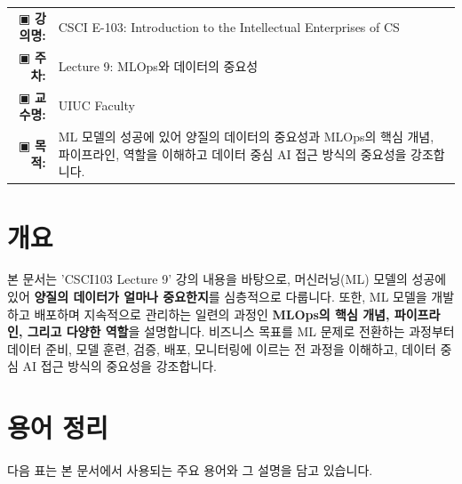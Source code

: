 \documentclass[11pt,a4paper]{article}
\makeatletter
\theoremstyle{definition}
\newcommand{\metainfo}[4]{
\begin{tcolorbox}[
    colback=lightpurple,
    colframe=darkpurple,
    boxrule=1pt,
    arc=2mm,
    left=10pt,
    right=10pt,
    top=8pt,
    bottom=8pt
]
\begin{tabular}{@{}rl@{}}
▣ \textbf{강의명:} & #1 \\[0.3em]
▣ \textbf{주차:} & #2 \\[0.3em]
▣ \textbf{교수명:} & #3 \\[0.3em]
▣ \textbf{목적:} & \begin{minipage}[t]{0.75\textwidth}#4\end{minipage}
\end{tabular}
\end{tcolorbox}
}
\makeatother
\begin{document}
\thispagestyle{firstpage}

\metainfo{CSCI E-103: Introduction to the Intellectual Enterprises of CS}{Lecture 9: MLOps와 데이터의 중요성}{UIUC Faculty}{ML 모델의 성공에 있어 양질의 데이터의 중요성과 MLOps의 핵심 개념, 파이프라인, 역할을 이해하고 데이터 중심 AI 접근 방식의 중요성을 강조합니다.}

\tableofcontents

\newpage

\section{개요}

\begin{summarybox}
본 문서는 'CSCI103 Lecture 9' 강의 내용을 바탕으로, 머신러닝(ML) 모델의 성공에 있어 \textbf{양질의 데이터가 얼마나 중요한지}를 심층적으로 다룹니다. 또한, ML 모델을 개발하고 배포하며 지속적으로 관리하는 일련의 과정인 \textbf{MLOps의 핵심 개념, 파이프라인, 그리고 다양한 역할}을 설명합니다. 비즈니스 목표를 ML 문제로 전환하는 과정부터 데이터 준비, 모델 훈련, 검증, 배포, 모니터링에 이르는 전 과정을 이해하고, 데이터 중심 AI 접근 방식의 중요성을 강조합니다.
\end{summarybox}

\newpage
\section{용어 정리}

다음 표는 본 문서에서 사용되는 주요 용어와 그 설명을 담고 있습니다.
\end{document}
